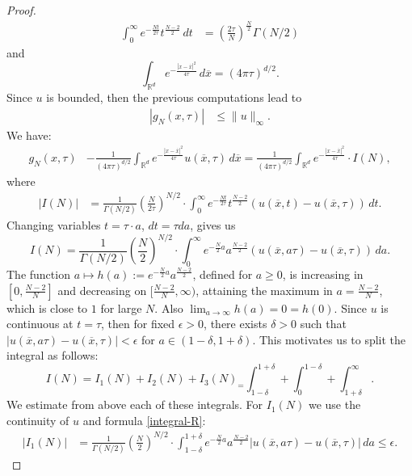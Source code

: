 \documentclass[11pt, twoside, notitlepage]{amsart}
\newcommand\R{\mathbb{R}}
\numberwithin{equation}{section}
\begin{document}
\begin{proof}
\begin{align}
   \int_0^\infty
   e^{ - \frac{ N  t}{2 \tau} }  t^{\frac{N-2}{2}  }   \, dt  &= \left( \frac{2\tau}{N} \right)^{\frac{N}{2}}   \Gamma(N/2)
\end{align}
and
$$\int_{\R^d}  e^{ - \frac{|x-\overline{x}|^2 }{4 \tau} } \, d \overline{x} =  (4 \pi \tau)^{d/2} .$$
Since $u$ is bounded, then the previous computations lead to
\begin{align*}
 | g_N(x,\tau)| & \le  \|u\|_{\infty}.
\end{align*}
We have:
\begin{align*}
  g_N(x,\tau) & - \frac{     1    }{ (4 \pi \tau)^{d/2}  }  \int_{\R^d}  e^{ - \frac{|x-\overline{x}|^2 }{4 \tau} }  u(\overline{x}, \tau ) \, d \overline{x}   =\frac{     1    }{ (4 \pi \tau)^{d/2}  }  \int_{\R^d}  e^{ - \frac{|x-\overline{x}|^2 }{4 \tau} } \cdot I(N),
\end{align*}
where
\begin{align*}
 | I(N)| & = \frac{1}{ \Gamma(N/2)}
  \left(  \frac{N}{2\tau} \right)^{N/2} \cdot   \int_0^\infty
   e^{ - \frac{ N  t}{2 \tau} }  t^{\frac{N-2}{2}  } \left( u(\overline{x}, t )  -  u(\overline{x}, \tau ) \right) \, dt.
\end{align*}
Changing variables $t=\tau \cdot a$, $dt=\tau da$, gives us
$$I(N)= \frac{1}{ \Gamma(N/2)}
  \left(  \frac{N}{2} \right)^{N/2} \cdot  \int_0^\infty
   e^{ - \frac{ N  }{2 }  a}  a^{\frac{N-2}{2}  } \left( u(\overline{x}, a \tau )  -  u(\overline{x}, \tau ) \right) \, da.
   $$
The function $a\mapsto  h(a):=e^{ - \frac{ N  }{2 }  a}  a^{\frac{N-2}{2}  } $, defined for $a \ge 0$, is increasing in $[0, \frac{N-2}{N}]$ and decreasing on $[\frac{N-2}{N},\infty)$, attaining the maximum in $a=\frac{N-2}{N}$, which is close to $1$ for large $N$. Also $\lim_{a\to \infty} h(a)=0 =h(0).$ Since $u$ is continuous at $t=\tau$, then for fixed $\epsilon>0$, there exists $\delta >0$  such that  $\left| u(\overline{x}, a\tau )  -  u(\overline{x}, \tau )\right|<\epsilon$ for $a \in (1-\delta, 1+\delta).$
This motivates us to split the integral as follows:
$$
I(N)= I_1(N) + I_2(N) + I_3(N) _= \int_{1-\delta}^{1+\delta} + \int_0^{1-\delta} + \int_{1+\delta}^{\infty}.
$$
We estimate from above each of these integrals. For $I_1(N)$ we use the continuity of $u$ and formula \eqref{integral-R}:
\begin{align*}
 | I_1(N)| & =  \frac{1}{ \Gamma(N/2)}
  \left(  \frac{N}{2} \right)^{N/2} \cdot   \int_{1-\delta}^{1+\delta}
   e^{ - \frac{ N  }{2} a }  a^{\frac{N-2}{2}  } \left| u(\overline{x}, a\tau )  -  u(\overline{x}, \tau ) \right| \, da  \le \epsilon.

\end{align*}
\end{proof}
\end{document}
